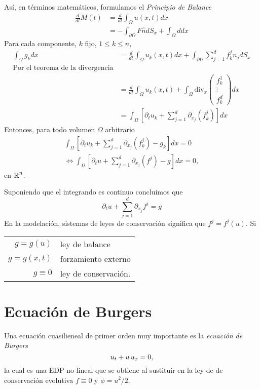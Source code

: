 Así, en términos matemáticos, formulamos el \textit{Principio de Balance}
\begin{align*}
\frac{d}{dt} M(t) &= \frac{d}{dt} \int_{\Omega} u(x,t) dx \\
				 &= - \int_{\partial \Omega} F \hat{n} dS_x + \int_{\Omega} d dx
\end{align*}
Para cada componente, $k$ fijo, $1\leq k \leq n$,
\begin{align*}
\int_{\Omega} g_k dx &= \frac{d}{dt} \int_{\Omega} u_k(x,t) dx + \int_{\partial\Omega} \sum_{j=1}^d f_k^j n_j dS_x \\
\text{Por el teorema de la divergencia} \\
			&= \frac{d}{dt} \int_{\Omega} u_k(x,t) + \int_{\Omega} \text{div}_x \begin{pmatrix}
								f_k^1 \\
								\vdots \\
								f_k^d
							\end{pmatrix} dx \\
			&= \int_{\Omega} \left[ \partial_t u_k + \sum_{j=1}^d \partial_{x_j} (f_k^j) \right] dx
\end{align*}
Entonces, para todo volumen $\Omega$ arbitrario
\begin{align*}
\int_{\Omega} \left[ \partial_t u_k + \sum_{j=1}^d \partial_{x_j} (f_k^j) - g_k \right] dx = 0	\\
\iff \int_{\Omega} \left[ \partial_t u + \sum_{j=1}^d \partial_{x_j} (f^j) - g \right] dx = 0,
\end{align*}
en $\operatorname{\mathbb R}^n$.

Suponiendo que el integrando es continuo concluimos que
\[
\partial_t u + \sum_{j=1}^d \partial_{x_j} f^j = g
\]
En la modelación, sistemas de leyes de conservación significa que $f^j = f^j(u)$. Si
\begin{tabular}{r l}
$g = g(u)$ & ley de balance \\
$g = g(x,t)$ & forzamiento externo \\
$g \equiv 0$ & ley de conservación.
\end{tabular}



\section{Ecuación de Burgers}
Una ecuación cuasilieneal de primer orden muy importante es la \textit{ecuación de Burgers}
\[ u_t + u \thinspace u_x = 0, \]
la cual es una EDP no lineal que se obtiene al sustituir en la ley de de conservación evolutiva $f \equiv 0$ y $\phi = u^2 /2$.

